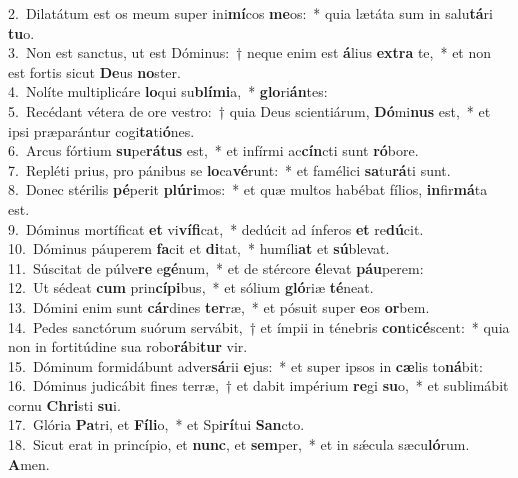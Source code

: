 {2.~}Dilatátum est os meum super ini\textbf{mí}cos \textbf{me}os:~* quia lætáta sum in salu\textbf{tá}ri \textbf{tu}o.\\
{3.~}Non est sanctus, ut est Dóminus:~† neque enim est \textbf{á}lius \textbf{ex}\textbf{tra} te,~* et non est fortis sicut \textbf{De}us \textbf{no}ster.\\
{4.~}Nolíte multiplicáre \textbf{lo}qui su\textbf{blí}\textbf{mi}a,~* \textbf{glo}ri\textbf{án}tes:\\
{5.~}Recédant vétera de ore vestro:~† quia Deus scientiárum, \textbf{Dó}mi\textbf{nus} est,~* et ipsi præparántur cogi\textbf{ta}ti\textbf{ó}nes.\\
{6.~}Arcus fórtium \textbf{su}pe\textbf{rá}\textbf{tus} est,~* et infírmi ac\textbf{cín}cti sunt \textbf{ró}bore.\\
{7.~}Repléti prius, pro pánibus se \textbf{lo}ca\textbf{vé}runt:~* et famélici \textbf{sa}tu\textbf{rá}ti sunt.\\
{8.~}Donec stérilis \textbf{pé}perit \textbf{plú}\textbf{ri}mos:~* et quæ multos habébat fílios, \textbf{in}fir\textbf{má}ta est.\\
{9.~}Dóminus mortíficat \textbf{et} vi\textbf{ví}\textbf{fi}cat,~* dedúcit ad ínferos \textbf{et} re\textbf{dú}cit.\\
{10.~}Dóminus páuperem \textbf{fa}cit et \textbf{di}tat,~* humíli\textbf{at} et \textbf{sú}blevat.\\
{11.~}Súscitat de púlve\textbf{re} e\textbf{gé}num,~* et de stércore \textbf{é}levat \textbf{páu}perem:\\
{12.~}Ut sédeat \textbf{cum} prin\textbf{cí}\textbf{pi}bus,~* et sólium \textbf{gló}riæ \textbf{té}neat.\\
{13.~}Dómini enim sunt \textbf{cár}dines \textbf{ter}ræ,~* et pósuit super \textbf{e}os \textbf{or}bem.\\
{14.~}Pedes sanctórum suórum servábit,~† et ímpii in ténebris \textbf{con}ti\textbf{cé}scent:~* quia non in fortitúdine sua robo\textbf{rá}bi\textbf{tur} vir.\\
{15.~}Dóminum formidábunt adver\textbf{sá}rii \textbf{e}jus:~* et super ipsos in \textbf{cæ}lis to\textbf{ná}bit:\\
{16.~}Dóminus judicábit fines terræ,~† et dabit impérium \textbf{re}gi \textbf{su}o,~* et sublimábit cornu \textbf{Chri}sti \textbf{su}i.\\
{17.~}Glória \textbf{Pa}tri, et \textbf{Fí}\textbf{li}o,~* et Spi\textbf{rí}tui \textbf{San}cto.\\
{18.~}Sicut erat in princípio, et \textbf{nunc}, et \textbf{sem}per,~* et in sǽcula sæcu\textbf{ló}rum. \textbf{A}men.\\
